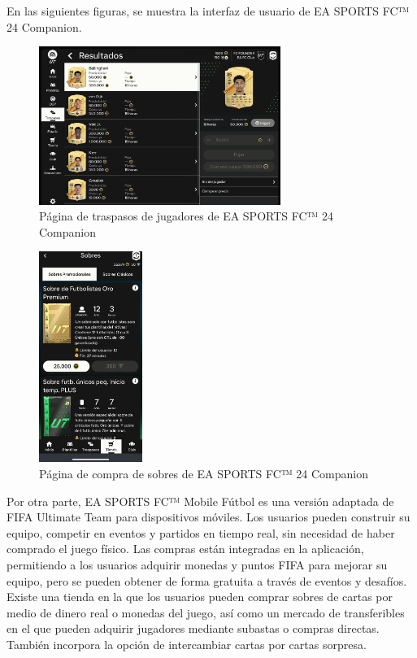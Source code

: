 En las siguientes figuras, se muestra la interfaz de usuario de EA SPORTS FC™ 24 Companion.

\begin{figure}[H]
    \centering
    \includegraphics[width=0.7\textwidth]{figures/4-Estudio-viabilidad/4_FC_Companion.png}
    \caption{Página de traspasos de jugadores de EA SPORTS FC™ 24 Companion}
    \label{fig:ea_sports_fc_1}
    \hypertarget{fig:ea_sports_fc_1}{}
\end{figure}

\begin{figure}[H]
    \centering
    \includegraphics[width=0.3\textwidth]{figures/4-Estudio-viabilidad/4_FC_Companion2.jpeg}
    \caption{Página de compra de sobres de EA SPORTS FC™ 24 Companion}
    \label{fig:ea_sports_fc_2}
    \hypertarget{fig:ea_sports_fc_2}{}
\end{figure}

Por otra parte, EA SPORTS FC™ Mobile Fútbol es una versión adaptada de FIFA Ultimate Team para dispositivos móviles. Los usuarios pueden construir su equipo, competir en eventos y partidos en tiempo real, sin necesidad de haber comprado el juego físico.
Las compras están integradas en la aplicación, permitiendo a los usuarios adquirir monedas y puntos FIFA para mejorar su equipo, pero se pueden obtener de forma gratuita a través de eventos y desafíos.
Existe una tienda en la que los usuarios pueden comprar sobres de cartas por medio de dinero real o monedas del juego, así como un mercado de transferibles en el que pueden adquirir jugadores mediante subastas o compras directas.
También incorpora la opción de intercambiar cartas por cartas sorpresa.

